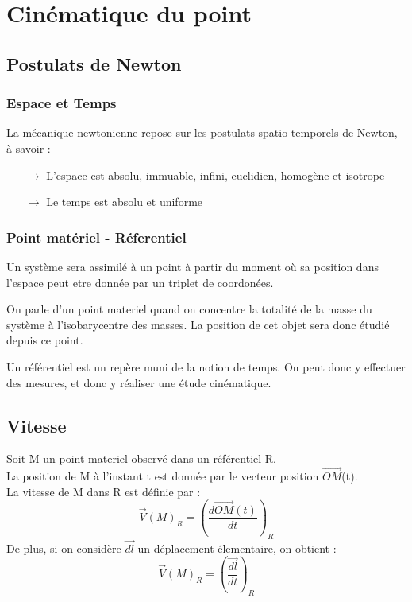 \chapter{Cinématique du point}

\section{Postulats de Newton}

\subsection{Espace et Temps}

La mécanique newtonienne repose sur les postulats spatio-temporels de Newton, à savoir :
\begin{itemize}
 \item[$\rightarrow$] L'espace est absolu, immuable, infini, euclidien, homogène et isotrope
 \item[$\rightarrow$] Le temps est absolu et uniforme
\end{itemize}

\subsection{Point matériel - Réferentiel}

\begin{de}
Un système sera assimilé à un point à partir du moment où sa position dans l'espace peut etre donnée par un triplet de coordonées.
\end{de}

\begin{de}
On parle d'un point materiel quand on concentre la totalité de la masse du système à l'isobarycentre des masses. La position de cet objet sera donc étudié depuis ce point.
\end{de}

\begin{de}
Un référentiel est un repère muni de la notion de temps. On peut donc y effectuer des mesures, et donc y réaliser une étude cinématique.
\end{de}

\section{Vitesse}

\begin{de}
Soit M un point materiel observé dans un référentiel R.\\
La position de M à l'instant t est donnée par le vecteur position $\vec{OM}$(t).\\
La vitesse de M dans R est définie par :
$$\vec{V}(M)_R = \left( \dfrac{d\vec{OM}(t)}{dt}\right)_R $$
De plus, si on considère $\vec{dl}$ un déplacement élementaire, on obtient :
$$\vec{V}(M)_R = \left( \dfrac{\vec{dl}}{dt}\right)_R $$
\end{de}

